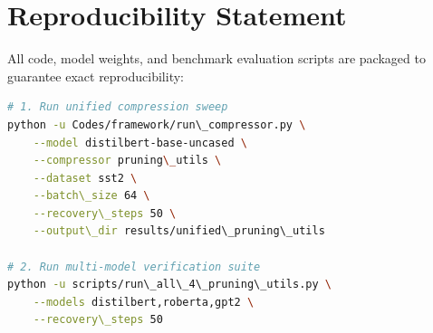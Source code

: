 \section{Reproducibility Statement}
All code, model weights, and benchmark evaluation scripts are packaged to guarantee exact reproducibility:
\begin{lstlisting}[language=bash]
# 1. Run unified compression sweep
python -u Codes/framework/run\_compressor.py \
    --model distilbert-base-uncased \
    --compressor pruning\_utils \
    --dataset sst2 \
    --batch\_size 64 \
    --recovery\_steps 50 \
    --output\_dir results/unified\_pruning\_utils

# 2. Run multi-model verification suite
python -u scripts/run\_all\_4\_pruning\_utils.py \
    --models distilbert,roberta,gpt2 \
    --recovery\_steps 50
\end{lstlisting}
